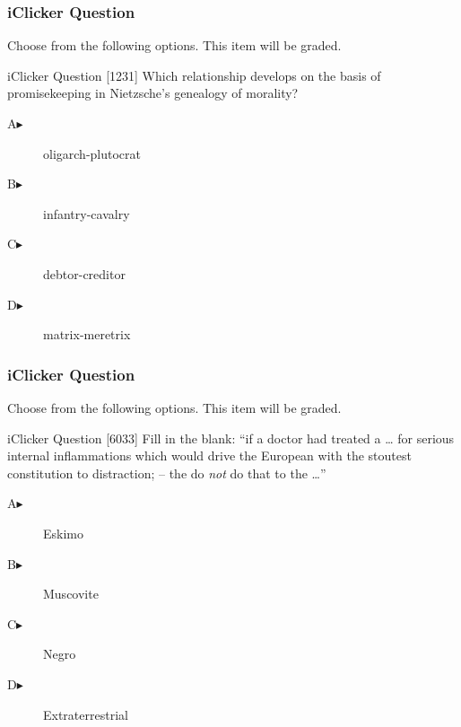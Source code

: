 \documentclass[xcolor=dvipsnames]{beamer}
\begin{document}
\begin{frame}
  \frametitle{iClicker Question}
Choose from the following options. This item will be graded.
\begin{block}{iClicker Question}
[1231] Which relationship develops on the basis of promisekeeping in Nietzsche's genealogy of morality?
\end{block}
\begin{description}
\item[A\hspace{.2in}$\blacktriangleright$] oligarch-plutocrat
\item[B\hspace{.2in}$\blacktriangleright$] infantry-cavalry
\item[C\hspace{.2in}$\blacktriangleright$] debtor-creditor
\item[D\hspace{.2in}$\blacktriangleright$] matrix-meretrix
\end{description}
\end{frame}

\begin{frame}
  \frametitle{iClicker Question}
Choose from the following options. This item will be graded.
\begin{block}{iClicker Question}
[6033] Fill in the blank: ``if a doctor had treated a {\ldots} for serious internal inflammations which would drive the European with the stoutest constitution to distraction; -- the do \emph{not} do that to the {\ldots}''
\end{block}
\begin{description}
\item[A\hspace{.2in}$\blacktriangleright$] Eskimo
\item[B\hspace{.2in}$\blacktriangleright$] Muscovite
\item[C\hspace{.2in}$\blacktriangleright$] Negro
\item[D\hspace{.2in}$\blacktriangleright$] Extraterrestrial
\end{description}
\end{frame}
\end{document}
